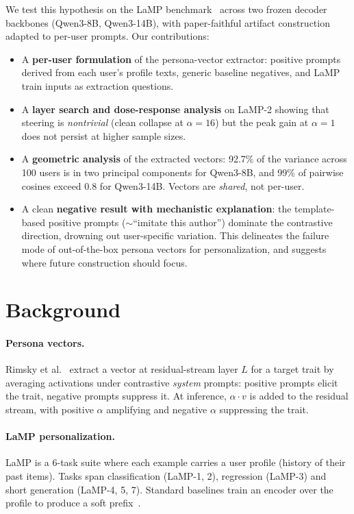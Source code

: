 \documentclass[10pt]{article}
\begin{document}
We test this hypothesis on the LaMP benchmark~\cite{salemi2024lamp} across
two frozen decoder backbones (Qwen3-8B, Qwen3-14B), with paper-faithful
artifact construction adapted to per-user prompts.  Our contributions:
\begin{itemize}
\item A \textbf{per-user formulation} of the persona-vector extractor:
positive prompts derived from each user's profile texts, generic baseline
negatives, and LaMP train inputs as extraction questions.
\item A \textbf{layer search and dose-response analysis} on LaMP-2 showing
that steering is \emph{nontrivial} (clean collapse at $\alpha{=}16$) but
the peak gain at $\alpha{=}1$ does not persist at higher sample sizes.
\item A \textbf{geometric analysis} of the extracted vectors: 92.7\% of
the variance across 100 users is in two principal components for
Qwen3-8B, and 99\% of pairwise cosines exceed 0.8 for Qwen3-14B.  Vectors
are \emph{shared}, not per-user.
\item A clean \textbf{negative result with mechanistic explanation}: the
template-based positive prompts ($\sim$``imitate this author'') dominate
the contrastive direction, drowning out user-specific variation.
This delineates the failure mode of out-of-the-box persona vectors for
personalization, and suggests where future construction should focus.
\end{itemize}

\section{Background}
\paragraph{Persona vectors.}
Rimsky et al.~\cite{rimsky2025persona} extract a vector at residual-stream
layer $L$ for a target trait by averaging activations under contrastive
\emph{system} prompts: positive prompts elicit the trait, negative prompts
suppress it.  At inference, $\alpha\!\cdot\!v$ is added to the residual
stream, with positive $\alpha$ amplifying and negative $\alpha$ suppressing
the trait.

\paragraph{LaMP personalization.}
LaMP is a 6-task suite where each example carries a user profile (history of
their past items).  Tasks span classification (LaMP-1, 2), regression
(LaMP-3) and short generation (LaMP-4, 5, 7).  Standard baselines train an
encoder over the profile to produce a soft prefix~\cite{salemi2024lamp}.
\end{document}
